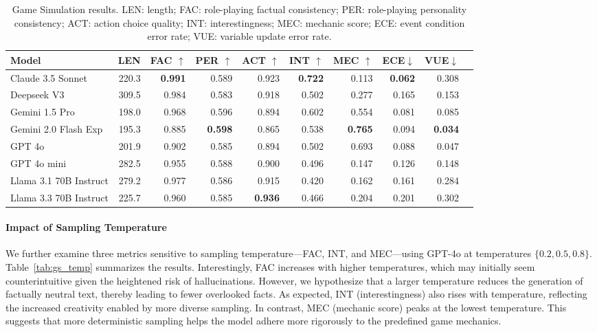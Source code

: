 \begin{table*}[!ht]
\centering
\begin{tabular}{lrrrrrrrrr}
\toprule
Model & LEN  & FAC $\uparrow$ & PER $\uparrow$& ACT $\uparrow$& INT $\uparrow$&  MEC $\uparrow$ &  ECE$\downarrow$ & VUE$\downarrow$\\ 
\midrule
Claude 3.5 Sonnet & 220.3 & \textbf{0.991} & 0.589 & 0.923 & \textbf{0.722} & 0.113 & \textbf{0.062} & 0.308\\
Deepseek V3 & 309.5 & 0.984 & 0.583 & 0.918 & 0.502 & 0.277 & 0.165 & 0.153 \\
Gemini 1.5 Pro & 198.0 & 0.968 & 0.596 & 0.894 & 0.602 & 0.554 & 0.081 & 0.085 \\
Gemini 2.0 Flash Exp & 195.3& 0.885 & \textbf{0.598} & 0.865 & 0.538 & \textbf{0.765} & 0.094 & \textbf{0.034} \\
GPT 4o & 201.9  & 0.902 & 0.585 & 0.894 & 0.502 & 0.693 & 0.088 & 0.047 \\
GPT 4o mini & 282.5  & 0.955 & 0.588 & 0.900 & 0.496 & 0.147 & 0.126 & 0.148 \\
Llama 3.1 70B Instruct & 279.2  & 0.977 & 0.586 & 0.915 & 0.420 & 0.162 & 0.161 &0.284\\
Llama 3.3 70B Instruct & 225.7 & 0.960 & 0.585 & \textbf{0.936} & 0.466 & 0.204 & 0.201 & 0.302\\
\bottomrule
\end{tabular}
\caption{Game Simulation results. LEN: length; FAC: role-playing factual consistency; PER: role-playing personality consistency; ACT: action choice quality; INT: interestingness; MEC: mechanic score; ECE: event condition error rate; VUE: variable update error rate.}
\label{tab:evaluation_results}
\end{table*}

\paragraph{Impact of Sampling Temperature} We further examine three metrics sensitive to sampling temperature—FAC, INT, and MEC—using GPT-4o at temperatures $\{0.2,0.5,0.8\}$. Table~\ref{tab:gs_temp} summarizes the results. Interestingly, FAC increases with higher temperatures, which may initially seem counterintuitive given the heightened risk of hallucinations. However, we hypothesize that a larger temperature reduces the generation of factually neutral text, thereby leading to fewer overlooked facts. As expected, INT (interestingness) also rises with temperature, reflecting the increased creativity enabled by more diverse sampling. In contrast, MEC (mechanic score) peaks at the lowest temperature. This suggests that more deterministic sampling helps the model adhere more rigorously to the predefined game mechanics.

